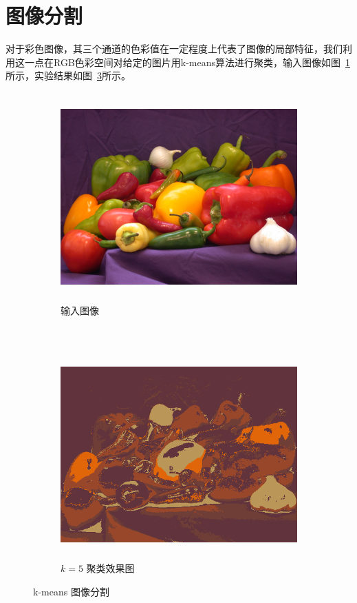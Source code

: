 \documentclass{ctexart}
\theoremstyle{definition}
\theoremstyle{remark}
\begin{document}
\section{图像分割}
对于彩色图像，其三个通道的色彩值在一定程度上代表了图像的局部特征，我们利用这一点在RGB色彩空间对给定的图片用k-means算法进行聚类，输入图像如图~\ref{fig:pepper}所示，实验结果如图~\ref{fig:segementation}所示。
\begin{figure}[!ht]
    \centering
    \begin{subfigure}[b]{\textwidth}
    \includegraphics[height=8cm, width=\textwidth]{pepper.jpg}
    \caption{输入图像}\label{fig:pepper}
    \end{subfigure}\\
    \begin{subfigure}[b]{\textwidth}
    \includegraphics[height=8cm, width=\textwidth]{segementation.png}
    \caption{$k=5$ 聚类效果图}\label{fig:segementation}
    \end{subfigure}
     \caption{k-means 图像分割}
\end{figure}
\end{document}
